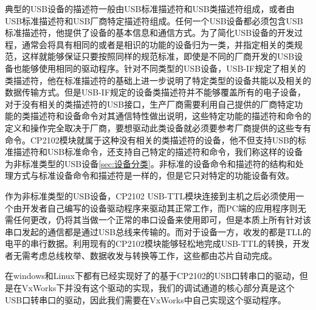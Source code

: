 	
	典型的USB设备的描述符一般由USB标准描述符和USB类描述符组成，或者由USB标准描述符和USB厂商特定描述符组成。任何一个USB设备都必须包含USB标准描述符，他提供了设备的基本信息和通信方式。为了简化USB设备的开发过程，通常会将具有相同的或者是相识的功能的设备归为一类，并指定相关的类规范，这样就能够保证只要按照同样的规范标准，即使是不同的厂商开发的USB设备也能够使用相同的驱动程序。针对不同类型的USB设备，USB-IF规定了相关的类描述符，他在标准描述符的基础上进一步说明了特定类型的设备共能以及相关的数据传输方式。但是USB-IF规定的设备类描述符并不能够覆盖所有的电子设备，对于没有相关的类描述符的USB接口，生产厂商需要利用自己提供的厂商特定功能的类描述符和设备命令对其通信特性做出说明，这些特定功能的描述符和命令的定义和操作完全取决于厂商，要想驱动此类设备就必须要参考厂商提供的这些专有命令。CP2102模块就属于这种没有相关的类描述符的设备，他不但支持USB的标准描述符和USB标准命令，还支持自己特定的描述符和命令，我们称这样的设备为非标准类型的USB设备\autoref{sec:设备分类}。非标准的设备命令和描述符的结构和处理方式与标准设备命令和描述符是一样的，但是它只对特定的功能设备有效。
	
	作为非标准类型的USB设备，CP2102 USB-TTL模块连接到主机之后必须使用一个由开发者自己编写的设备驱动程序来驱动其正常工作，而PC端的应用程序则无需任何更改，仍将其当做一个正常的串口设备来使用即可，但是本质上所有针对该串口发起的通信都是通过USB总线来传输的。而对于设备一方，收发的都是TLL的电平的串行数据。利用现有的CP2102模块能够轻松地完成USB-TTL的转换，开发者无需考虑总线枚举、数据收发与转换等工作，这些都由芯片自动完成。
	
	在windows和Linux下都有已经实现好了的基于CP2102的USB口转串口的驱动，但是在VxWorks下并没有这个驱动的实现，我们的调试通道的核心部分真是这个USB口转串口的驱动，因此我们需要在VxWorks中自己实现这个驱动程序。
		



